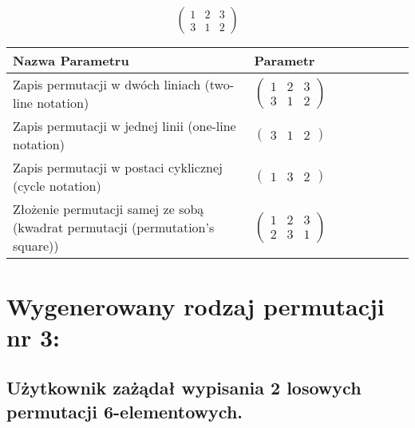 \documentclass[12pt]{article}
\begin{document}
\subsection{}
\begin{center}
\[
\begin{pmatrix}
	1 & 2 & 3 \\ 
	3 & 1 & 2 
\end{pmatrix}
\]

\begin{tabular}{|m{0.6\linewidth}|m{0.4\linewidth}|}
	\hline
	Nazwa Parametru & Parametr \\
	\hline
	Zapis permutacji w dwóch liniach (two-line notation) & $\begin{pmatrix} 1 & 2 & 3 \\ 
3 & 1 & 2 \end{pmatrix}$ \\ 
	\hline
	Zapis permutacji w jednej linii (one-line notation) & $\begin{pmatrix} 3 & 1 & 2 \end{pmatrix}$ \\ 
	\hline
	Zapis permutacji w postaci cyklicznej (cycle notation) & $\begin{pmatrix} 1 & 3 & 2 \end{pmatrix} $ \\ 
	\hline
	Złożenie permutacji samej ze sobą (kwadrat permutacji (permutation's square)) & $\begin{pmatrix} 1 & 2 & 3 \\ 
2 & 3 & 1 \end{pmatrix}$ \\ 
	\hline
\end{tabular}
\end{center}


\section{Wygenerowany rodzaj permutacji nr 3:}
\subsection*{Użytkownik zażądał wypisania 2 losowych permutacji 6-elementowych.}
\end{document}
